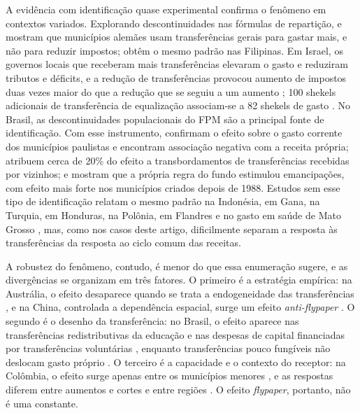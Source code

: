 A evidência com identificação quase experimental confirma o fenômeno em contextos variados. Explorando descontinuidades nas fórmulas de repartição, \citet{Baskaran20161} e \citet{Langer2019737} mostram que municípios alemães usam transferências gerais para gastar mais, e não para reduzir impostos; \citet{SantosMamaradlo202133} obtêm o mesmo padrão nas Filipinas. Em Israel, os governos locais que receberam mais transferências elevaram o gasto e reduziram tributos e déficits, e a redução de transferências provocou aumento de impostos duas vezes maior do que a redução que se seguiu a um aumento \citep{Shani2023}; 100 shekels adicionais de transferência de equalização associam-se a 82 shekels de gasto \citep{Dahan2022}. No Brasil, as descontinuidades populacionais do FPM são a principal fonte de identificação. Com esse instrumento, \citet{Bernardelli2026} confirmam o efeito sobre o gasto corrente dos municípios paulistas e encontram associação negativa com a receita própria; \citet{Castro2021221} atribuem cerca de 20\% do efeito a transbordamentos de transferências recebidas por vizinhos; e \citet{Mota2026528} mostram que a própria regra do fundo estimulou emancipações, com efeito mais forte nos municípios criados depois de 1988. Estudos sem esse tipo de identificação relatam o mesmo padrão na Indonésia, em Gana, na Turquia, em Honduras, na Polônia, em Flandres e no gasto em saúde de Mato Grosso \citep{Wati2022353, Dick-Sagoe2025, Yuksel2021483, Dibo2025459, Bastida20221298, Guziejewska2021587, Goeminne2017285, deSouza202693}, mas, como nos casos deste artigo, dificilmente separam a resposta às transferências da resposta ao ciclo comum das receitas.

A robustez do fenômeno, contudo, é menor do que essa enumeração sugere, e as divergências se organizam em três fatores. O primeiro é a estratégia empírica: na Austrália, o efeito desaparece quando se trata a endogeneidade das transferências \citep{WorthingtonDollery1999}, e na China, controlada a dependência espacial, surge um efeito \textit{anti-flypaper} \citep{Yu201693}. O segundo é o desenho da transferência: no Brasil, o efeito aparece nas transferências redistributivas da educação \citep{Cruz2020} e nas despesas de capital financiadas por transferências voluntárias \citep{Luz2022}, enquanto transferências pouco fungíveis não deslocam gasto próprio \citep{Bruce2019111, Flynn2022}. O terceiro é a capacidade e o contexto do receptor: na Colômbia, o efeito surge apenas entre os municípios menores \citep{Ortega202279}, e as respostas diferem entre aumentos e cortes \citep{Suha2024} e entre regiões \citep{Masiero2020481}. O efeito \textit{flypaper}, portanto, não é uma constante.

